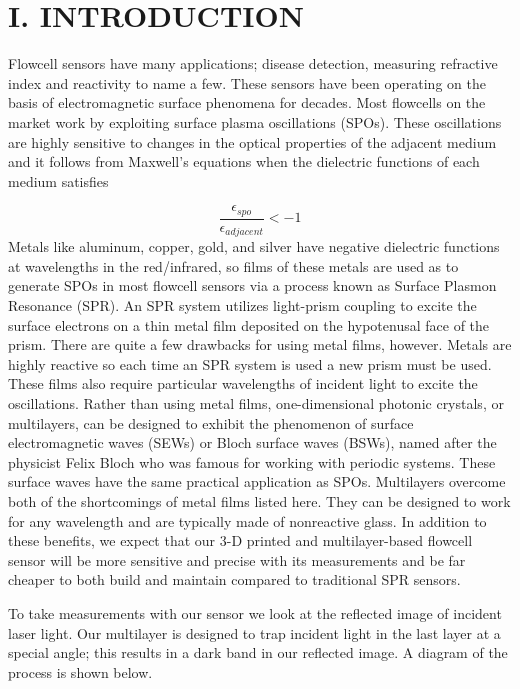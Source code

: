\selectfont
{}
\section*{I. INTRODUCTION}
\begin{flushleft}
	\hspace{0.5in}
	Flowcell sensors have many applications; disease detection, measuring refractive index and reactivity to name a few. These sensors have been operating on the basis of electromagnetic surface phenomena for decades. Most flowcells on the market work by exploiting surface plasma oscillations (SPOs). These oscillations are highly sensitive to changes in the optical properties of the adjacent medium and it follows from Maxwell's equations when the dielectric functions of each medium satisfies \cite{JLTROB:1}
	
	\[
    	\frac{\epsilon_{spo}}{\epsilon_{adjacent}} < -1
	\]
	\hspace{0.5in}
	Metals like aluminum, copper, gold, and silver have negative dielectric functions at wavelengths in the red/infrared, so films of these metals are used as to generate SPOs in most flowcell sensors via a process known as Surface Plasmon Resonance (SPR). An SPR system utilizes light-prism coupling to excite the surface electrons on a thin metal film deposited on the hypotenusal face of the prism. There are quite a few drawbacks for using metal films, however. Metals are highly reactive so each time an SPR system is used a new prism must be used. These films also require particular wavelengths of incident light to excite the oscillations. Rather than using metal films, one-dimensional photonic crystals, or multilayers, can be designed to exhibit the phenomenon of surface electromagnetic waves (SEWs) or Bloch surface waves (BSWs), named after the physicist Felix Bloch who was famous for working with periodic systems. These surface waves have the same practical application as SPOs. Multilayers overcome both of the shortcomings of metal films listed here. They can be designed to work for any wavelength and are typically made of nonreactive glass. In addition to these benefits, we expect that our 3-D printed and multilayer-based flowcell sensor will be more sensitive and precise with its measurements and be far cheaper to both build and maintain compared to traditional SPR sensors.

	\hspace{0.5in}
	To take measurements with our sensor we look at the reflected image of incident laser light. Our multilayer is designed to trap incident light in the last layer at a special angle; this results in a dark band in our reflected image. A diagram of the process is shown below.
	

\end{flushleft}
